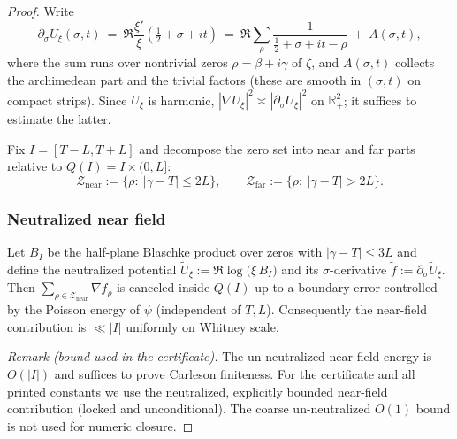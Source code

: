 \documentclass[11pt]{article}
\theoremstyle{definition}
\theoremstyle{remark}
\newcommand{\R}{\mathbb{R}}
\begin{document}
\begin{proof}
Write
\[
 \partial_\sigma U_{\xi}(\sigma,t)\ =\ \Re\frac{\xi'}{\xi}\!\left(\tfrac12+\sigma+it\right)
 \ =\ \Re\sum_{\rho}\frac{1}{\tfrac12+\sigma+it-\rho}\ +\ A(\sigma,t),
\]
where the sum runs over nontrivial zeros $\rho=\beta+i\gamma$ of $\zeta$, and $A(\sigma,t)$ collects the archimedean part and the trivial factors (these are smooth in $(\sigma,t)$ on compact strips). Since $U_{\xi}$ is harmonic, $|\nabla U_{\xi}|^2\asymp |\partial_\sigma U_{\xi}|^2$ on $\R^2_+$; it suffices to estimate the latter.

Fix $I=[T-L,T+L]$ and decompose the zero set into near and far parts relative to $Q(I)=I\times(0,L]$:
\[
 \mathcal Z_{\mathrm{near}}:=\{\rho:\ |\gamma-T|\le 2L\},\qquad \mathcal Z_{\mathrm{far}}:=\{\rho:\ |\gamma-T|>2L\}.
\]

















\vspace{1.0cm}
\subsubsection*{Neutralized near field}
Let $B_I$ be the half-plane Blaschke product over zeros with $|\gamma-T|\le 3L$ and define the neutralized potential $\widetilde U_\xi:=\Re\log\big(\xi\,B_I\big)$ and its $\sigma$-derivative $\widetilde f:=\partial_\sigma\widetilde U_\xi$. Then $\sum_{\rho\in \mathcal Z_{\mathrm{near}}}\nabla f_\rho$ is canceled inside $Q(I)$ up to a boundary error controlled by the Poisson energy of $\psi$ (independent of $T,L$). Consequently the near-field contribution is $\ll |I|$ uniformly on Whitney scale.

\noindent\emph{Remark (bound used in the certificate).} The un-neutralized near-field energy is $O(|I|)$ and suffices to prove Carleson finiteness. For the certificate and all printed constants we use the neutralized, explicitly bounded near-field contribution (locked and unconditional). The coarse un-neutralized $O(1)$ bound is not used for numeric closure.


\end{proof}
\end{document}
